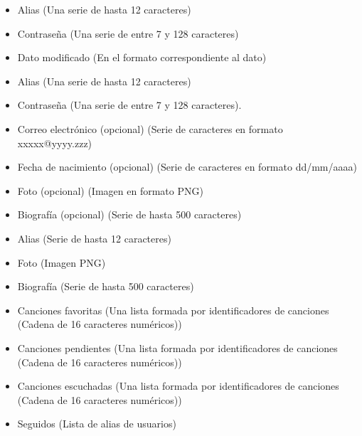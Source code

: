 \begin{itemize}
\item Alias (Una serie de hasta 12 caracteres)
\item Contraseña (Una serie de entre 7 y 128 caracteres)
\end{itemize}

\begin{itemize}
\item Dato modificado (En el formato correspondiente al dato)
\end{itemize}

\begin{itemize}
  \item Alias (Una serie de hasta 12 caracteres)
  \item Contraseña (Una serie de entre 7 y 128 caracteres).
  \item Correo electrónico (opcional) (Serie de caracteres en formato xxxxx@yyyy.zzz)
  \item Fecha de nacimiento (opcional) (Serie de caracteres en formato dd/mm/aaaa)
  \item Foto (opcional) (Imagen en formato PNG)
  \item Biografía (opcional) (Serie de hasta 500 caracteres)
\end{itemize}

\begin{itemize}
\item Alias (Serie de hasta 12 caracteres)
\item Foto (Imagen PNG)
\item Biografía (Serie de hasta 500 caracteres)
\item Canciones favoritas (Una lista formada por identificadores de canciones (Cadena de 16 caracteres numéricos))
\item Canciones pendientes (Una lista formada por identificadores de canciones (Cadena de 16 caracteres numéricos))
\item Canciones escuchadas (Una lista formada por identificadores de canciones (Cadena de 16 caracteres numéricos))
\item Seguidos (Lista de alias de usuarios)
\end{itemize}


